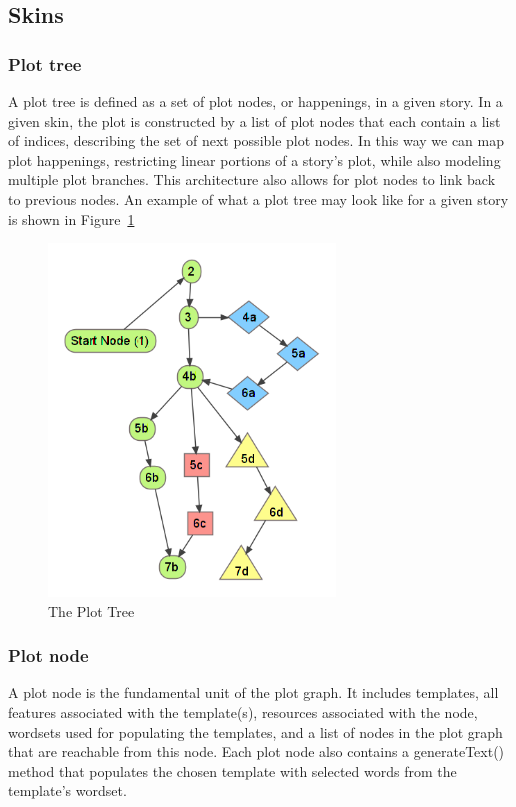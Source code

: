 \documentclass[journal]{./IEEEtran}
\begin{document}
\subsection{Skins}
\subsubsection{Plot tree}
A plot tree is defined as a set of plot nodes, or happenings, in a given story. In a given skin, the plot is constructed by a list of plot nodes that each contain a list of indices, describing the set of next possible plot nodes. In this way we can map plot happenings, restricting linear portions of a story’s plot, while also modeling multiple plot branches. This architecture also allows for plot nodes to link back to previous nodes. An example of what a plot tree may look like for a given story is shown in Figure~\ref{plotree}

\begin{figure}[h!]
\begin{center}
\includegraphics[width=3.0in]{./plotTree}
\end{center}
\caption{The \sysname{} Plot Tree}
\label{plotree}
\end{figure}


\subsubsection{Plot node}
A plot node is the fundamental unit of the plot graph. It includes templates, all features associated with the template(s), resources associated with the node, wordsets used for populating the templates, and a list of nodes in the plot graph that are reachable from this node. Each plot node also contains a generateText() method that populates the chosen template with selected words from the template's wordset. 
\end{document}
